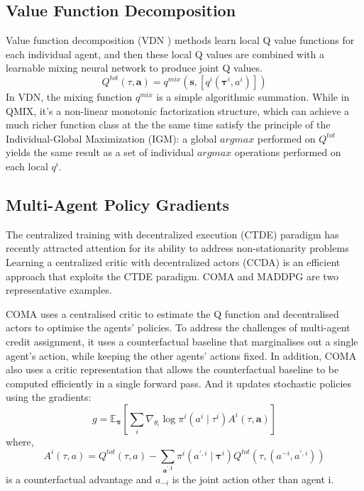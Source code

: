 \documentclass[runningheads]{llncs}
\begin{document}
\subsection{Value Function Decomposition}
Value function decomposition (VDN ) \cite{b9} methods learn local Q value functions for each individual agent, and then these local Q values are combined with a learnable mixing neural network to produce
joint Q values. 
\begin{equation}
	Q^{t o t}(\tau, \mathbf{a})=q^{mix}(\boldsymbol{s}, \left[ q^{i}\left(\boldsymbol{\tau}^{i}, a^{i}\right)\right])
\end{equation}
In VDN, the mixing function ${ q^{mix}}$ is a simple algorithmic summation. While in QMIX, it's a non-linear monotonic factorization structure, which can achieve a much richer function class at the the same time satisfy the principle of the Individual-Global Maximization (IGM):  a global $argmax$ performed on $Q^{tot}$ yields the same result as a set of individual $argmax$ operations
performed on each local $q^i$.

\subsection{Multi-Agent Policy Gradients}
The centralized training with decentralized execution (CTDE)
paradigm has recently attracted attention for its ability
to address non-stationarity problems 
Learning a centralized
critic with decentralized actors (CCDA) is an efficient approach that exploits the CTDE paradigm.
COMA and MADDPG are two representative examples.

COMA uses a centralised critic to estimate the Q function
and decentralised actors to optimise the agents’ policies. To address the challenges of multi-agent credit assignment,
it uses a counterfactual baseline that marginalises
out a single agent’s action, while keeping the other agents’
actions fixed. In addition, COMA also uses a critic representation that allows
the counterfactual baseline to be computed efficiently in
a single forward pass. And it updates stochastic policies using the gradients:
\begin{equation}
	g=\mathbb{E}_{\boldsymbol{\pi}}\left[\sum_{i} \nabla_{\theta_{i}} \log \pi^{i}\left(a^{i} \mid \tau^{i}\right) A^{i}(\tau, \boldsymbol{a})\right]
\end{equation}
where, $$
A^{i}(\tau, a)=Q^{t o t}(\tau, a)- \sum_{\boldsymbol{a^{\prime,i}}} {\pi}^{i}({a^{\prime,i}} \mid \boldsymbol{\tau}^{i}) Q^{t o t}\left(\tau,\left(a^{-i}, a^{\prime,i}\right)\right)$$  is a counterfactual advantage and ${a_{-i}}$ is the
joint action other than agent i.
\end{document}
